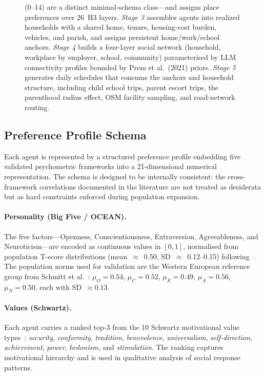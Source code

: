 \documentclass[a4paper,12pt]{article}
\begin{document}
\begin{figure}[H]
{(0--14) are a distinct minimal-schema class---and assigns place preferences over
26~H3 layers. \emph{Stage 3} assembles agents into realized households with a
shared home, tenure, housing-cost burden, vehicles, and parish, and assigns
persistent home/work/school anchors. \emph{Stage 4} builds a four-layer social
network (household, workplace by employer, school, community) parameterised by
LLM connectivity profiles bounded by Prem et al.\ (2021) priors. \emph{Stage 5}
generates daily schedules that consume the anchors and household structure,
including child school trips, parent escort trips, the parenthood radius effect,
OSM facility sampling, and road-network routing.}
\label{fig:system_architecture}
\end{figure}

\subsection{Preference Profile Schema}
\label{subsec:schema}

Each agent is represented by a structured preference profile embedding five
validated psychometric frameworks into a 21-dimensional numerical representation.
The schema is designed to be internally consistent: the cross-framework
correlations documented in the literature are not treated as desiderata but
as hard constraints enforced during population expansion.

\paragraph{Personality (Big Five / OCEAN).}
The five factors---Openness, Conscientiousness, Extraversion, Agreeableness,
and Neuroticism---are encoded as continuous values in $[0,1]$, normalised from
population T-score distributions (mean~$\approx$~0.50, SD~$\approx$~0.12--0.15)
following~\cite{costa1992neopersonality,schmitt2007geographic}. The population
norms used for validation are the Western European reference group from
Schmitt et al.~\cite{schmitt2007geographic}: $\mu_O = 0.54$, $\mu_C = 0.52$,
$\mu_E = 0.49$, $\mu_A = 0.56$, $\mu_N = 0.50$, each with SD~$\approx 0.13$.

\paragraph{Values (Schwartz).}
Each agent carries a ranked top-3 from the 10 Schwartz motivational value
types~\cite{schwartz1992universals}: \textit{security}, \textit{conformity},
\textit{tradition}, \textit{benevolence}, \textit{universalism},
\textit{self-direction}, \textit{achievement}, \textit{power},
\textit{hedonism}, and \textit{stimulation}. The ranking captures motivational
hierarchy and is used in qualitative analysis of social response patterns.
\end{document}
